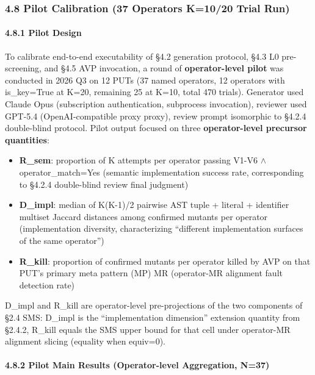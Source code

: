 \documentclass[review,12pt,authoryear]{elsarticle}
\providecommand{\tightlist}{\setlength{\itemsep}{0pt}\setlength{\parskip}{0pt}}
\begin{document}
\subsubsection{4.8 Pilot Calibration (37 Operators K=10/20 Trial
Run)}\label{pilot-calibration-37-operators-k1020-trial-run}

\paragraph{4.8.1 Pilot Design}\label{pilot-design}

To calibrate end-to-end executability of §4.2 generation protocol, §4.3
L0 pre-screening, and §4.5 AVP invocation, a round of
\textbf{operator-level pilot} was conducted in 2026 Q3 on 12 PUTs (37
named operators, 12 operators with is\_key=True at K=20, remaining 25 at
K=10, total 470 trials). Generator used Claude Opus (subscription
authentication, subprocess invocation), reviewer used GPT-5.4 (OpenAI-compatible proxy
proxy), review prompt isomorphic to §4.2.4 double-blind protocol. Pilot
output focused on three \textbf{operator-level precursor quantities}:

\begin{itemize}
\tightlist
\item
  \textbf{R\_sem}: proportion of K attempts per operator passing V1-V6 $\wedge$
  operator\_match=Yes (semantic implementation success rate,
  corresponding to §4.2.4 double-blind review final judgment)
\item
  \textbf{D\_impl}: median of K(K-1)/2 pairwise AST tuple + literal +
  identifier multiset Jaccard distances among confirmed mutants per
  operator (implementation diversity, characterizing ``different
  implementation surfaces of the same operator'')
\item
  \textbf{R\_kill}: proportion of confirmed mutants per operator killed
  by AVP on that PUT's primary meta pattern (MP) MR (operator-MR
  alignment fault detection rate)
\end{itemize}

D\_impl and R\_kill are operator-level pre-projections of the two
components of §2.4 SMS: D\_impl is the ``implementation dimension''
extension quantity from §2.4.2, R\_kill equals the SMS upper bound for
that cell under operator-MR alignment slicing (equality when equiv=0).

\paragraph{4.8.2 Pilot Main Results (Operator-level Aggregation,
N=37)}\label{pilot-main-results-operator-level-aggregation-n37}
\end{document}
